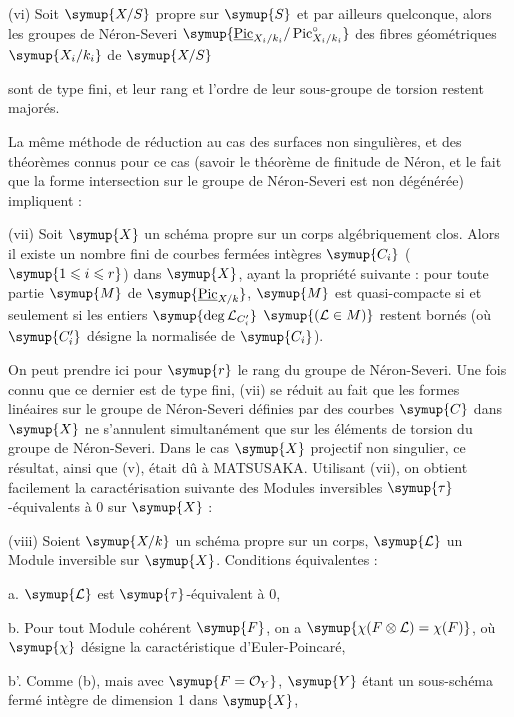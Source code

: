 \medskip
\noindent(vi) Soit $\symup{X/S}$ propre sur $\symup{S}$ et par ailleurs quelconque, alors les
groupes de Néron-Severi
$\symup{\underline{\operatorname{Pic}}_{X_i/k_i}/\operatorname{Pic}_{X_i/k_i}^\circ}$
des fibres géométriques $\symup{X_i/k_i}$ de $\symup{X/S}$

sont de type fini, et leur rang et l'ordre de leur sous-groupe de torsion
restent majorés.

La même méthode de réduction au cas des surfaces non singulières, et des
théorèmes connus pour ce cas (savoir le théorème de finitude de Néron, et le
fait que la forme intersection sur le groupe de Néron-Severi est non
dégénérée) impliquent :

\medskip
\noindent(vii) Soit $\symup{X}$ un schéma propre sur un corps algébriquement clos.
Alors il existe un nombre fini de courbes fermées intègres $\symup{C_i}$
($\symup{1\leqslant i\leqslant r}$) dans $\symup{X}$, ayant la propriété suivante : pour toute partie
$\symup{M}$ de $\symup{\underline{\operatorname{Pic}}_{X/k}}$, $\symup{M}$ est quasi-compacte si et seulement si
les entiers $\symup{\deg\mathcal L_{C_i'}}$ $\symup{(\mathcal L\in M)}$
restent bornés (où $\symup{C_i'}$ désigne la normalisée de $\symup{C_i}$).

On peut prendre ici pour $\symup{r}$ le rang du groupe de Néron-Severi. Une fois connu
que ce dernier est de type fini, (vii) se réduit au fait que les formes
linéaires sur le groupe de Néron-Severi définies par des courbes $\symup{C}$ dans $\symup{X}$
ne s'annulent simultanément que sur les éléments de torsion du groupe de
Néron-Severi. Dans le cas $\symup{X}$ projectif non singulier, ce résultat, ainsi que
(v), était dû à MATSUSAKA. Utilisant (vii), on obtient facilement la
caractérisation suivante des Modules inversibles $\symup{\tau}$-équivalents à 0 sur
$\symup{X}$ :

\medskip
\noindent(viii) Soient $\symup{X/k}$ un schéma propre sur un corps, $\symup{\mathcal L}$ un
Module inversible sur $\symup{X}$. Conditions équivalentes :

\noindent a. $\symup{\mathcal L}$ est $\symup{\tau}$-équivalent à 0,

\noindent b. Pour tout Module cohérent $\symup{F}$, on a $\symup{\chi(F\otimes\mathcal L)=\chi(F)}$, où $\symup{\chi}$ désigne la caractéristique d'Euler-Poincaré,

\noindent b'. Comme (b), mais avec $\symup{F=\mathcal O_Y}$, $\symup{Y}$ étant un
sous-schéma fermé intègre de dimension 1 dans $\symup{X}$,

